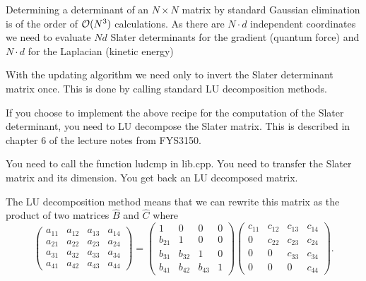 \documentclass[graybox,sectrefs,envcountresetchap,open=right]{svmonodo}
\begin{document}
Determining a determinant of an $N \times N$ matrix by
standard Gaussian elimination is of the order of ${\cal O}(N^3)$
calculations. As there are $N\cdot d$ independent coordinates we need
to evaluate $Nd$ Slater determinants for the gradient (quantum force) and
$N\cdot d$ for the Laplacian (kinetic energy)

With the updating algorithm we need only to invert the Slater determinant matrix once.
This is done by calling standard LU decomposition methods.


If you choose to implement the above recipe for the computation of the Slater determinant,
you need to LU decompose the Slater matrix. This is described in chapter 6 of the lecture notes 
from FYS3150.

You need to call the function ludcmp in lib.cpp.
You need to transfer the Slater matrix and its dimension. You get back an LU decomposed matrix.



The LU decomposition method means that we can rewrite
this matrix as the product of two matrices $\hat{B}$ and $\hat{C}$
where 
\[
   \left(\begin{array}{cccc}
                          a_{11} & a_{12} & a_{13} & a_{14} \\
                          a_{21} & a_{22} & a_{23} & a_{24} \\
                          a_{31} & a_{32} & a_{33} & a_{34} \\
                          a_{41} & a_{42} & a_{43} & a_{44} 
                      \end{array} \right)
                      = \left( \begin{array}{cccc}
                              1  & 0      & 0      & 0 \\
                          b_{21} & 1      & 0      & 0 \\
                          b_{31} & b_{32} & 1      & 0 \\
                          b_{41} & b_{42} & b_{43} & 1 
                      \end{array} \right) 
                        \left( \begin{array}{cccc}
                          c_{11} & c_{12} & c_{13} & c_{14} \\
                               0 & c_{22} & c_{23} & c_{24} \\
                               0 & 0      & c_{33} & c_{34} \\
                               0 & 0      &  0     & c_{44} 
             \end{array} \right).
\]
\end{document}
